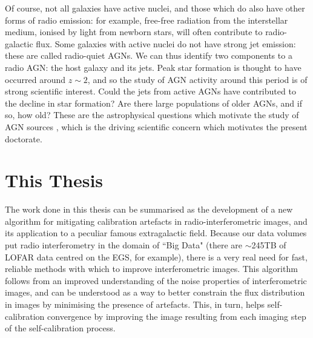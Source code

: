 \pg
Of course, not all galaxies have active nuclei, and those which do also have other forms of radio emission: for example, free-free radiation from the interstellar medium, ionised by light from newborn stars, will often contribute to radio-galactic flux. Some galaxies with active nuclei do not have strong jet emission: these are called radio-quiet AGNs. We can thus identify two components to a radio AGN: the host galaxy and its jets. Peak star formation is thought to have occurred around $z\sim2$, and so the study of AGN activity around this period is of strong scientific interest. Could the jets from active AGNs have contributed to the decline in star formation? Are there large populations of older AGNs, and if so, how old? These are the astrophysical questions which motivate the study of AGN sources , which is the driving scientific concern which motivates the present doctorate.
%
%




\clearpage



\clearpage


\clearpage
\section{This Thesis}

\pg
The work done in this thesis can be summarised as the development of a new algorithm for mitigating calibration artefacts in radio-interferometric images, and its application to a peculiar famous extragalactic field. Because our data volumes put radio interferometry in the domain of ``Big Data" (there are $\sim$245TB of LOFAR data centred on the EGS, for example), there is a very real need for fast, reliable methods with which to improve interferometric images. This algorithm follows from an improved understanding of the noise properties of interferometric images, and can be understood as a way to better constrain the flux distribution in images by minimising the presence of artefacts. This, in turn, helps self-calibration convergence by improving the image resulting from each imaging step of the self-calibration process. 

